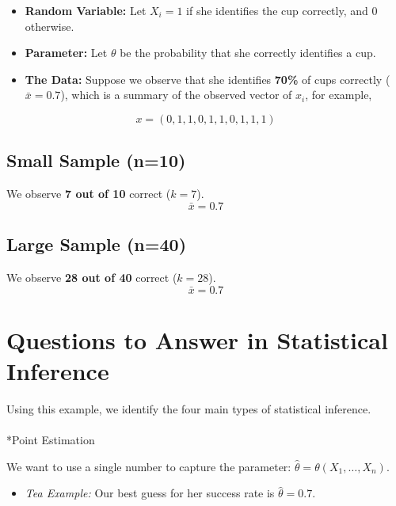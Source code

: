 \documentclass[
  letterpaper,
  DIV=11,
  numbers=noendperiod]{scrreprt}
\makeatletter
\let\oldparagraph\paragraph
\renewcommand{\paragraph}{
    \@ifstar
      \xxxParagraphStar
      \xxxParagraphNoStar
  }
\newcommand{\xxxParagraphStar}[1]{\oldparagraph*{#1}\mbox{}}
\newcommand{\xxxParagraphNoStar}[1]{\oldparagraph{#1}\mbox{}}
\providecommand{\tightlist}{%
  \setlength{\itemsep}{0pt}\setlength{\parskip}{0pt}}
\renewcommand{\[}{\begin{equation}}
\renewcommand{\]}{\end{equation}}
\theoremstyle{definition}
\theoremstyle{plain}
\theoremstyle{plain}
\theoremstyle{plain}
\theoremstyle{definition}
\theoremstyle{plain}
\theoremstyle{remark}
\makeatother
\begin{document}
\begin{itemize}
\tightlist
\item
  \textbf{Random Variable:} Let \(X_i=1\) if she identifies the cup
  correctly, and \(0\) otherwise.
\item
  \textbf{Parameter:} Let \(\theta\) be the probability that she
  correctly identifies a cup.
\item
  \textbf{The Data:} Suppose we observe that she identifies
  \textbf{70\%} of cups correctly (\(\bar{x} = 0.7\)), which is a
  summary of the observed vector of \(x_i\), for example,
\end{itemize}

\[x=(0,1,1,0, 1,1,0,1,1,1)\]

\subsection{Small Sample (n=10)}

We observe \textbf{7 out of 10} correct (\(k=7\)). \[\bar{x} = 0.7\]

\subsection{Large Sample (n=40)}

We observe \textbf{28 out of 40} correct (\(k=28\)). \[\bar{x} = 0.7\]

\section{Questions to Answer in Statistical
Inference}\label{questions-to-answer-in-statistical-inference}

Using this example, we identify the four main types of statistical
inference.

\paragraph*{Point Estimation}\label{point-estimation}

We want to use a single number to capture the parameter:
\(\hat{\theta} = \theta(X_1, \dots, X_n)\).

\begin{itemize}
\tightlist
\item
  \emph{Tea Example:} Our best guess for her success rate is
  \(\hat{\theta} = 0.7\).
\end{itemize}
\end{document}
